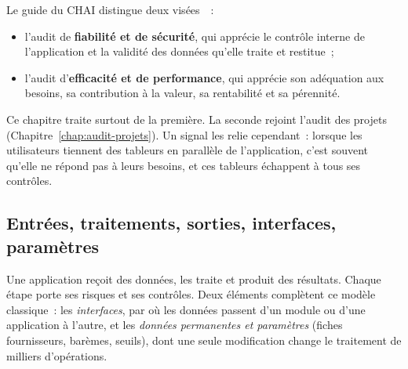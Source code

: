 Le guide du CHAI distingue deux visées~\cite{chai2014guide}~:
\begin{itemize}
    \item l'audit de \textbf{fiabilité et de sécurité}, qui apprécie le
          contrôle interne de l'application et la validité des données
          qu'elle traite et restitue~;
    \item l'audit d'\textbf{efficacité et de performance}, qui apprécie son
          adéquation aux besoins, sa contribution à la valeur, sa
          rentabilité et sa pérennité.
\end{itemize}
Ce chapitre traite surtout de la première. La seconde rejoint l'audit des
projets (Chapitre~\ref{chap:audit-projets}). Un signal les relie
cependant~: lorsque les utilisateurs tiennent des tableurs en parallèle de
l'application, c'est souvent qu'elle ne répond pas à leurs besoins, et ces
tableurs échappent à tous ses contrôles.

\subsection{Entrées, traitements, sorties, interfaces, paramètres}

Une application reçoit des données, les traite et produit des résultats.
Chaque étape porte ses risques et ses contrôles. Deux éléments complètent
ce modèle classique~: les \emph{interfaces}, par où les données passent
d'un module ou d'une application à l'autre, et les \emph{données
permanentes et paramètres} (fiches fournisseurs, barèmes, seuils), dont
une seule modification change le traitement de milliers d'opérations.

